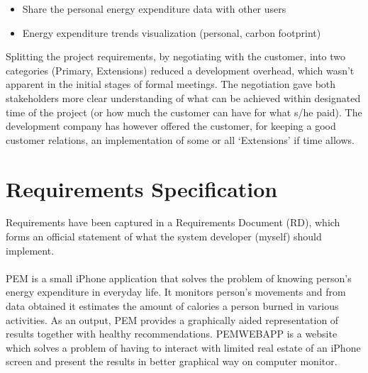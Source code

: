 \documentclass[12pt, a4paper]{report}   %
\begin{document}
\begin{enumerate}
\begin{itemize}
\begin{itemize}
			\item Share the personal energy expenditure data with other users
			\item Energy expenditure trends visualization (personal, carbon footprint)
		\end{itemize}
	\end{itemize}
Splitting the project requirements, by negotiating with the customer, into two categories (Primary, Extensions) reduced a development overhead, which wasn't apparent in the initial stages of formal meetings. The negotiation gave both stakeholders more clear understanding of what can be achieved within designated time of the project (or how much the customer can have for what s/he paid). The development company has however offered the customer, for keeping a good customer relations, an implementation of some or all ‘Extensions' if time allows.


\section{Requirements Specification}
Requirements have been captured in a Requirements Document (RD), which forms an official statement of what the system developer (myself) should implement.\\ \\
PEM is a small iPhone application that solves the problem of knowing person's energy expenditure in everyday life. It monitors person's movements and from data obtained it estimates the amount of calories a person burned in various activities. As an output, PEM provides a graphically aided representation of results together with healthy recommendations. PEMWEBAPP is a website which solves a problem of having to interact with limited real estate of an iPhone screen and present the results in better graphical way on computer monitor.


\end{enumerate}
\end{document}
